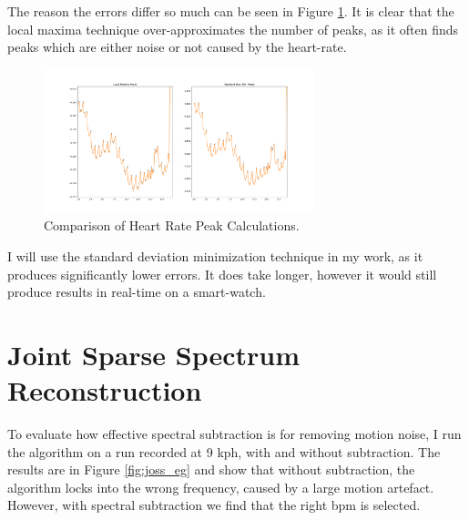 \documentclass[12pt,a4paper,twoside,openright]{report}
\begin{document}
The reason the errors differ so much can be seen in Figure
\ref{fig:hr-peak-comparison}. It is clear that the local maxima technique
over-approximates the number of peaks, as it often finds peaks which are
either noise or not caused by the heart-rate.

\begin{figure}[tbh]
	\centering
	\includegraphics[width=0.7\textwidth]{figs/peak-comparison.png}
	\caption{Comparison of Heart Rate Peak Calculations.}
	\label{fig:hr-peak-comparison}
\end{figure}

I will use the standard deviation minimization technique in my work, as it
produces significantly lower errors. It does take longer, however it would
still produce results in real-time on a smart-watch.

\section{Joint Sparse Spectrum Reconstruction}

To evaluate how effective spectral subtraction is for removing motion noise, I
run the algorithm on a run recorded at 9 kph, with and without subtraction.
The results are in Figure \ref{fig:joss_eg} and show that without subtraction,
the algorithm locks into the wrong frequency, caused by a large motion
artefact. However, with spectral subtraction we find that the right bpm is
selected.
\end{document}
